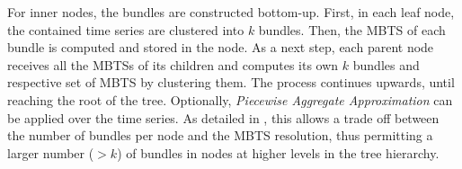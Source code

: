 For inner nodes, the bundles are constructed bottom-up. First, in each leaf node, the contained time series are clustered into $k$ bundles. Then, the MBTS of each bundle is computed and stored in the node. As a next step, each parent node receives all the MBTSs of its children and computes its own $k$ bundles and respective set of MBTS by clustering them. The process continues upwards, until reaching the root of the tree. Optionally, \emph{Piecewise Aggregate Approximation} \cite{keogh2001paa,faloutsos2000vldb} can be applied over the time series. As detailed in \cite{chatzig17btsr}, this allows a trade off between the number of bundles per node and the MBTS resolution, thus permitting a larger number ($>k$) of bundles in nodes at higher levels in the tree hierarchy.





